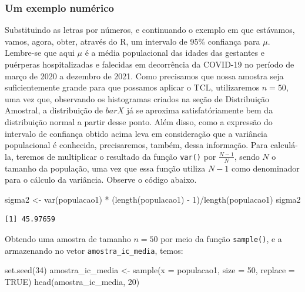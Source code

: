 \documentclass[
  letterpaper,
  DIV=11,
  numbers=noendperiod]{scrreprt}
\newenvironment{Shaded}{\begin{snugshade}}{\end{snugshade}}
\newcommand{\AttributeTok}[1]{\textcolor[rgb]{0.40,0.45,0.13}{#1}}
\newcommand{\ConstantTok}[1]{\textcolor[rgb]{0.56,0.35,0.01}{#1}}
\newcommand{\DecValTok}[1]{\textcolor[rgb]{0.68,0.00,0.00}{#1}}
\newcommand{\FunctionTok}[1]{\textcolor[rgb]{0.28,0.35,0.67}{#1}}
\newcommand{\NormalTok}[1]{\textcolor[rgb]{0.00,0.23,0.31}{#1}}
\newcommand{\OtherTok}[1]{\textcolor[rgb]{0.00,0.23,0.31}{#1}}
\newcommand{\SpecialCharTok}[1]{\textcolor[rgb]{0.37,0.37,0.37}{#1}}
\begin{document}
\hypertarget{um-exemplo-numuxe9rico}{%
\subsubsection{Um exemplo numérico}\label{um-exemplo-numuxe9rico}}

Substituindo as letras por números, e continuando o exemplo em que
estávamos, vamos, agora, obter, através do R, um intervalo de 95\%
confiança para \(\mu\). Lembre-se que aqui \(\mu\) é a média
populacional das idades das gestantes e puérperas hospitalizadas e
falecidas em decorrência da COVID-19 no período de março de 2020 a
dezembro de 2021. Como precisamos que nossa amostra seja suficientemente
grande para que possamos aplicar o TCL, utilizaremos \(n = 50\), uma vez
que, observando os histogramas criados na seção de Distribuição
Amostral, a distribuição de \(bar{X}\) já se aproxima satisfatóriamente
bem da distribuição normal a partir desse ponto. Além disso, como a
expressão do intervalo de confiança obtido acima leva em consideração
que a variância populacional é conhecida, precisaremos, também, dessa
informação. Para calculá-la, teremos de multiplicar o resultado da
função \texttt{var()} por \(\frac{N - 1}{N}\), sendo \(N\) o tamanho da
população, uma vez que essa função utiliza \(N - 1\) como denominador
para o cálculo da variância. Observe o código abaixo.

\begin{Shaded}
\begin{Highlighting}[]
\NormalTok{sigma2 }\OtherTok{\textless{}{-}} \FunctionTok{var}\NormalTok{(populacao1) }\SpecialCharTok{*}\NormalTok{ (}\FunctionTok{length}\NormalTok{(populacao1) }\SpecialCharTok{{-}} \DecValTok{1}\NormalTok{)}\SpecialCharTok{/}\FunctionTok{length}\NormalTok{(populacao1)}
\NormalTok{sigma2}
\end{Highlighting}
\end{Shaded}

\begin{verbatim}
[1] 45.97659
\end{verbatim}

Obtendo uma amostra de tamanho \(n = 50\) por meio da função
\texttt{sample()}, e a armazenando no vetor \texttt{amostra\_ic\_media},
temos:

\begin{Shaded}
\begin{Highlighting}[]
\FunctionTok{set.seed}\NormalTok{(}\DecValTok{34}\NormalTok{)}
\NormalTok{amostra\_ic\_media }\OtherTok{\textless{}{-}} \FunctionTok{sample}\NormalTok{(}\AttributeTok{x =}\NormalTok{ populacao1, }\AttributeTok{size =} \DecValTok{50}\NormalTok{, }\AttributeTok{replace =} \ConstantTok{TRUE}\NormalTok{)}
\FunctionTok{head}\NormalTok{(amostra\_ic\_media, }\DecValTok{20}\NormalTok{)}
\end{Highlighting}
\end{Shaded}
\end{document}
